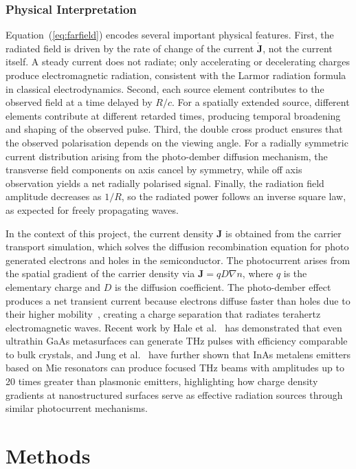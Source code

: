\documentclass[12pt]{final_project_report}
\begin{document}
\subsubsection{Physical Interpretation}
Equation~(\ref{eq:farfield}) encodes several important physical features. First, the radiated field is driven by the rate of change of the current $\dot{\mathbf{J}}$, not the current itself. A steady current does not radiate; only accelerating or decelerating charges produce electromagnetic radiation, consistent with the Larmor radiation formula in classical electrodynamics. Second, each source element contributes to the observed field at a time delayed by $R/c$. For a spatially extended source, different elements contribute at different retarded times, producing temporal broadening and shaping of the observed pulse. Third, the double cross product ensures that the observed polarisation depends on the viewing angle. For a radially symmetric current distribution arising from the photo-dember diffusion mechanism, the transverse field components on axis cancel by symmetry, while off axis observation yields a net radially polarised signal. Finally, the radiation field amplitude decreases as $1/R$, so the radiated power follows an inverse square law, as expected for freely propagating waves.

In the context of this project, the current density $\mathbf{J}$ is obtained from the carrier transport simulation, which solves the diffusion recombination equation for photo generated electrons and holes in the semiconductor. The photocurrent arises from the spatial gradient of the carrier density via $\mathbf{J} = qD\nabla n$, where $q$ is the elementary charge and $D$ is the diffusion coefficient. The photo-dember effect produces a net transient current because electrons diffuse faster than holes due to their higher mobility~\cite{Reklaitis2010}, creating a charge separation that radiates terahertz electromagnetic waves. Recent work by Hale et al.~\cite{Hale2022} has demonstrated that even ultrathin GaAs metasurfaces can generate THz pulses with efficiency comparable to bulk crystals, and Jung et al.~\cite{Jung2024} have further shown that InAs metalens emitters based on Mie resonators can produce focused THz beams with amplitudes up to 20 times greater than plasmonic emitters, highlighting how charge density gradients at nanostructured surfaces serve as effective radiation sources through similar photocurrent mechanisms.

\section{Methods}
\end{document}
